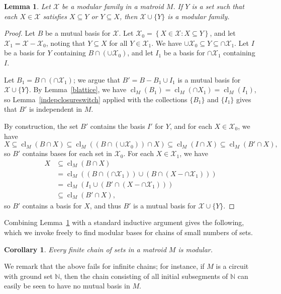 \documentclass{amsart}
\theoremstyle{plain}
\newtheorem{lemma}[theorem]{Lemma}
\newtheorem{corollary}[theorem]{Corollary}
\theoremstyle{definition}
\newcommand{\bN}{\mathbb N}
\newcommand{\cX}{\mathcal{X}}
\DeclareMathOperator{\cl}{cl}
\newcommand{\set}[1]{\left\{#1\right\}}
\newcommand{\br}[1]{\left(#1\right)}
\renewcommand{\ss}{\subseteq}
\newcommand{\setof}[2]{\set{{#1} : {#2}}}
\begin{document}
\begin{lemma}\label{modularinsert}
  Let $\cX$ be a modular family in a matroid $M$. If $Y$ is a set such that each $X \in \cX$ satisfies $X \ss Y$ or $Y \ss X$, 
  then $\cX \cup \{Y\}$ is a modular family. 
\end{lemma}
\begin{proof}
  Let $B$ be a mutual basis for $\cX$. 
  Let $\cX_0 = \setof{X \in \cX}{X \ss Y}$, and let $\cX_1 = \cX - \cX_0$, noting that $Y \ss X$ for all $Y \in \cX_1$.
  We have $\cup \cX_0 \ss Y \ss \cap \cX_1$. 
  Let $I$ be a basis for $Y$ containing $B \cap (\cup \cX_0)$, and let $I_1$ be a basis for $\cap \cX_1$ containing $I$. 

  Let $B_1 = B \cap (\cap \cX_1)$; we argue that $B' = B - B_1 \cup I_1$ is a mutual basis for $\cX \cup \{Y\}$. 
  By Lemma~\ref{blattice}, we have $\cl_M(B_1) = \cl_M(\cap X_1) = \cl_M(I_1)$, so Lemma~\ref{indepclosureswitch}
  applied with the collections $\{B_1\}$ and $\{I_1\}$ gives that $B'$ is independent in $M$. 

  By construction, the set $B'$ contains the basis $I'$ for $Y$, and for each $X \in \cX_0$, 
  we have 
  \[X \ss \cl_M(B \cap X) \ss \cl_M((B \cap (\cup \cX_0)) \cap X) \ss \cl_M(I \cap X) \ss \cl_M(B' \cap X),\]
  so $B'$ contains bases for each set in $\cX_0$. For each $X \in \cX_1$, we have
  \begin{align*}
      X &\ss \cl_M(B \cap X) \\
      &= \cl_M(\br{B \cap (\cap \cX_1)} \cup \br{B \cap (X - \cap \cX_1)}) \\ 
      &= \cl_M\br{I_1 \cup (B' \cap (X - \cap \cX_1))} \\ 
      &\ss \cl_M(B' \cap X),
  \end{align*}
  so $B'$ contains a basis for $X$, and thus $B'$ is a mutual basis for $\cX \cup \{Y\}$.
\end{proof}

Combining Lemma~\ref{modularinsert} with a standard inductive argument gives the following, which 
we invoke freely to find modular bases for chains of small numbers of sets. 

\begin{corollary}
  Every finite chain of sets in a matroid $M$ is modular. 
\end{corollary}

We remark that the above fails for infinite chains; for instance, if $M$ is 
a circuit with ground set $\bN$, then the chain consisting of all initial subsegments of $\bN$ 
can easily be seen to have no mutual basis in $M$. 
\end{document}
